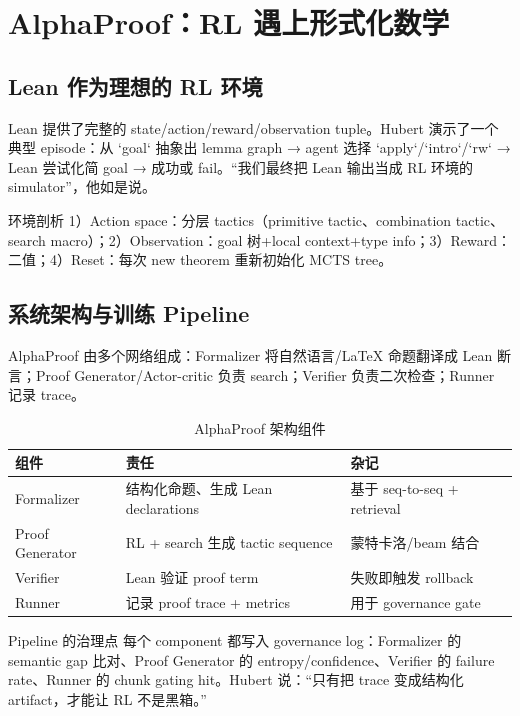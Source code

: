 \section{AlphaProof：RL 遇上形式化数学}

\subsection{Lean 作为理想的 RL 环境}
Lean 提供了完整的 state/action/reward/observation tuple。Hubert 演示了一个典型 episode：从 `goal` 抽象出 lemma graph → agent 选择 `apply`/`intro`/`rw` → Lean 尝试化简 goal → 成功或 fail。“我们最终把 Lean 输出当成 RL 环境的 simulator”，他如是说。
\begin{importantbox}{环境剖析}
1）Action space：分层 tactics（primitive tactic、combination tactic、search macro）；2）Observation：goal 树+local context+type info；3）Reward：二值；4）Reset：每次 new theorem 重新初始化 MCTS tree。
\end{importantbox}

\subsection{系统架构与训练 Pipeline}
AlphaProof 由多个网络组成：Formalizer 将自然语言/LaTeX 命题翻译成 Lean 断言；Proof Generator/Actor-critic 负责 search；Verifier 负责二次检查；Runner 记录 trace。
\begin{table}[H]
\centering
\begin{tabular}{p{4.5cm}p{4.5cm}p{4cm}}
\toprule
组件 & 责任 & 杂记 \\
\midrule
Formalizer & 结构化命题、生成 Lean declarations & 基于 seq-to-seq + retrieval \\
Proof Generator & RL + search 生成 tactic sequence & 蒙特卡洛/beam 结合 \\
Verifier & Lean 验证 proof term & 失败即触发 rollback \\
Runner & 记录 proof trace + metrics & 用于 governance gate \\
\bottomrule
\end{tabular}
\caption{AlphaProof 架构组件}
\end{table}
\begin{knowledgebox}{Pipeline 的治理点}
每个 component 都写入 governance log：Formalizer 的 semantic gap 比对、Proof Generator 的 entropy/confidence、Verifier 的 failure rate、Runner 的 chunk gating hit。Hubert 说：“只有把 trace 变成结构化 artifact，才能让 RL 不是黑箱。”
\end{knowledgebox}

